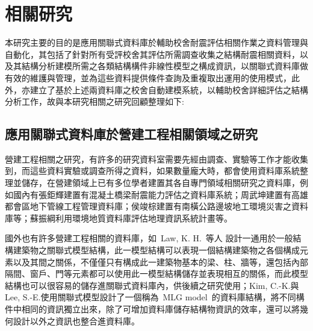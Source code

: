 \renewcommand\thetable{\arabic{chapter}-\arabic{table}}
\renewcommand{\theequation}{\arabic{chapter}-\arabic{equation}}
\chapter{相關研究}

本研究主要的目的是應用關聯式資料庫於輔助校舍耐震評估相關作業之資料管理與自動化，其包括了針對所有受評校舍其評估所需調查收集之結構耐震相關資料，以及其結構分析建模所需之各類結構構件非線性模型之構成資訊，以關聯式資料庫做有效的維護與管理，並為這些資料提供條件查詢及重複取出運用的使用模式，此外，亦建立了基於上述兩資料庫之校舍自動建模系統，以輔助校舍詳細評估之結構分析工作，故與本研究相關之研究回顧整理如下:

\section{應用關聯式資料庫於營建工程相關領域之研究}
 
營建工程相關之研究，有許多的研究資料室需要先經由調查、實驗等工作才能收集到，而這些資料實驗或調查所得之資料，如果數量龐大時，都會使用資料庫系統整理並儲存，在營建領域上已有多位學者建置其各自專門領域相關研究之資料庫，例如國內有張鉅輝\cite{chang2003master}建置有混凝土橋梁耐震能力評估之資料庫系統；周武坤\cite{chou2002master}建置有高雄都會區地下管線工程管理資料庫；侯竣棕\cite{hou2000master}建置有南橫公路邊坡地工環境災害之資料庫等；蘇振綱\cite{su2000master}利用環境地質資料庫評估地理資訊系統計畫等。

國外也有許多營建工程相關的資料庫，如~Law, K. H.~等人\cite{law1990management} 設計一通用於一般結構建築物之關聯式模型結構，此一模型結構可以表現一個結構建築物之各個構成元素以及其間之關係，不僅僅只有構成此一建築物基本的梁、柱、牆等，還包括內部隔間、窗戶、門等元素都可以使用此一模型結構儲存並表現相互的關係，而此模型結構也可以很容易的儲存進關聯式資料庫內，供後續之研究使用；Kim, C.-K.與 Lee, S.-E.\cite{kim2000study}使用關聯式模型設計了一個稱為~MLG model~的資料庫結構，將不同構件中相同的資訊獨立出來，除了可增加資料庫儲存結構物資訊的效率，還可以將幾何設計以外之資訊也整合進資料庫。

